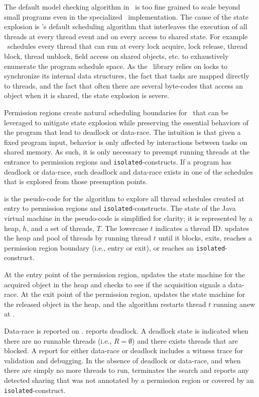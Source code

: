 The default model checking algorithm in \jpf\ is too fine grained to
scale beyond small programs even in the specialized
\hjv\ implementation. The cause of the state explosion is \jpf's
default scheduling algorithm that interleaves the execution of all
threads at every thread event and on every access to shared state. For
example \jpf\ schedules every thread that can run at every lock
acquire, lock release, thread block, thread unblock, field access on
shared objects, etc. to exhaustively enumerate the program schedule
space. As the \hjv\ library relies on locks to synchronize its
internal data structures, the fact that tasks are mapped directly to
threads, and the fact that often there are several byte-codes that
access an object when it is shared, the state explosion is severe.

Permission regions create natural scheduling boundaries for \jpf\ that
can be leveraged to mitigate state explosion while preserving the
essential behaviors of the program that lead to deadlock or
data-race. The intuition is that given a fixed program input, behavior
is only affected by interactions between tasks on shared memory. As
such, it is only necessary to preempt running threads at the
entrance to permission regions and \texttt{isolated}-constructs. If a program has deadlock or
data-race, such deadlock and data-race exists in one of the
schedules that is explored from those preemption points.

 is the pseudo-code for the algorithm to explore all thread schedules
created at entry to permission regions and \texttt{isolated}-constructs. The state of the Java virtual
machine in the pseudo-code is simplified for clarity; it is
represented by a heap, $h$, and a set of threads, $T$. The lowercase
$t$ indicates a thread ID.  updates the heap and pool
of threads by running thread $t$ until it blocks, exits, reaches a
permission region boundary (i.e., entry or exit), or reaches an \texttt{isolated}-construct.

At the entry point of the permission region, 
updates the state machine for the acquired object in the heap and
checks to see if the acquisition signals a data-race. At the exit
point of the permission region,  updates the
state machine for the released object in the heap, and the algorithm
restarts thread $t$ running anew at .

Data-race is reported on
.  reports deadlock. A
deadlock state is indicated when there are no runnable threads (i.e.,
$R = \emptyset$) and there exists threads that are blocked. A report
for either data-race or deadlock includes a witness trace for
validation and debugging. In the absence of deadlock or data-race, and
when there are simply no more threads to run,  terminates the search
and reports any detected sharing that was not annotated by a permission region or covered by an \texttt{isolated}-construct.

